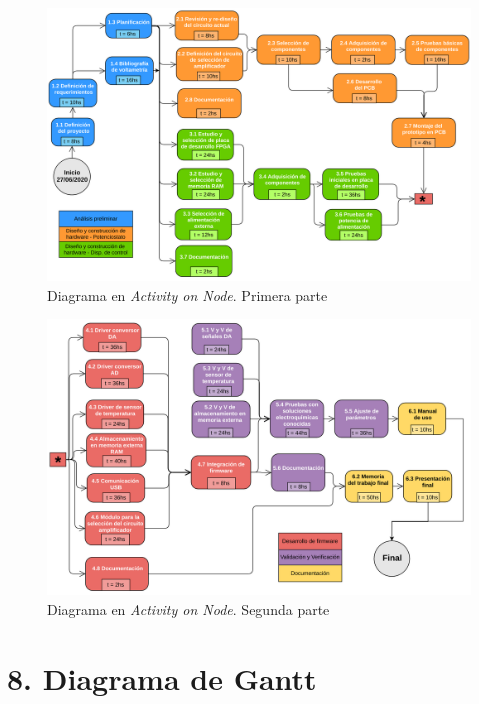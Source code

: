 \documentclass[11pt]{charter}
\begin{document}
\begin{figure}[H]
\centering 
\includegraphics[width=1\textwidth]{./Figuras/Activity-On-Node1.png}
\caption{Diagrama en \textit{Activity on Node}. Primera parte}
\label{fig:AoN1}
\end{figure}

\begin{figure}[H]
\centering 
\includegraphics[width=1\textwidth]{./Figuras/Activity-On-Node2.png}
\caption{Diagrama en \textit{Activity on Node}. Segunda parte}
\label{fig:AoN2}
\end{figure}

\section{8. Diagrama de Gantt}
\label{sec:gantt}
\end{document}
